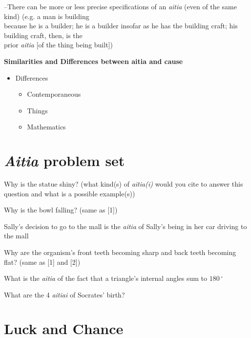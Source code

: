 \documentclass[11pt]{article}
\begin{document}
--There can be more or less precise specifications of an \emph{aitia} (even of the same kind) (e.g. a man is building\\\hspace*{6mm}because he is a builder; he is a builder insofar as he has the building craft; his building craft, then, is the\\\hspace*{6mm}prior \emph{aitia} [of the thing being built])
\vspace*{2mm}

\noindent\textbf{Similarities and Differences between aitia and cause}
\begin{itemize}\item{Differences}\begin{itemize}\item{Contemporaneous}\item{Things}\item{Mathematics}\end{itemize}\end{itemize}

\section*{\emph{Aitia} problem set}

\noindent [1] Why is the statue shiny? (what kind(s) of \emph{aitia(i)} would you cite to answer this question and what is a possible example(s))
\vspace*{1.5mm}

\noindent [2] Why is the bowl falling? (same as [1])
\vspace*{1.5mm}

\noindent [3] Sally's decision to go to the mall is the\hspace*{25mm} \emph{aitia} of Sally's being in her car driving to the mall
\vspace*{1.5mm}

\noindent [4] Why are the organism's front teeth becoming sharp and back teeth becoming flat? (same as [1] and [2]) 
\vspace*{1.5mm}

\noindent [5] What is the \emph{aitia} of the fact that a triangle's internal angles sum to $180\,^{\circ}$
\vspace*{1.5mm}

\noindent [6] What are the 4 \emph{aitiai} of Socrates' birth?
\vspace*{1.5mm}

\section*{Luck and Chance}
\end{document}
